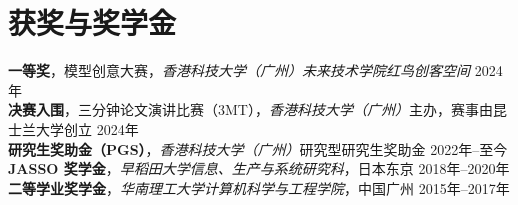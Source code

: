 \section*{获奖与奖学金}

\noindent
\textbf{一等奖}，模型创意大赛，\textit{香港科技大学（广州）未来技术学院红鸟创客空间}
    \hfill 2024年 \\
\noindent
\textbf{决赛入围}，三分钟论文演讲比赛（3MT），\textit{香港科技大学（广州）}主办，赛事由昆士兰大学创立
    \hfill 2024年\\
\noindent
\textbf{研究生奖助金（PGS）}，\textit{香港科技大学（广州）}研究型研究生奖助金
    \hfill 2022年--至今\\
\noindent
\textbf{JASSO 奖学金}，\textit{早稻田大学信息、生产与系统研究科}，日本东京
    \hfill 2018年--2020年\\
\noindent
\textbf{二等学业奖学金}，\textit{华南理工大学计算机科学与工程学院}，中国广州
    \hfill 2015年--2017年
